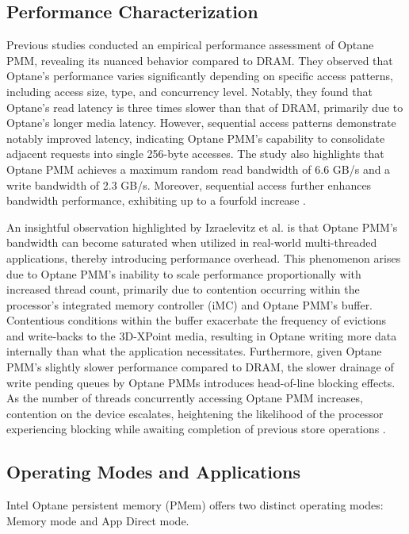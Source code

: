 \subsection{Performance Characterization}
Previous studies \cite{yang2020empirical,izraelevitz2019basic} conducted an empirical performance assessment of Optane PMM, revealing its nuanced behavior compared to DRAM. They observed that Optane's performance varies significantly depending on specific access patterns, including access size, type, and concurrency level. Notably, they found that Optane's read latency is three times slower than that of DRAM, primarily due to Optane's longer media latency. However, sequential access patterns demonstrate notably improved latency, indicating Optane PMM's capability to consolidate adjacent requests into single 256-byte accesses. The study also highlights that Optane PMM achieves a maximum random read bandwidth of 6.6 GB/s and a write bandwidth of 2.3 GB/s. Moreover, sequential access further enhances bandwidth performance, exhibiting up to a fourfold increase \cite{yang2020empirical,izraelevitz2019basic}.

An insightful observation highlighted by Izraelevitz et al. \cite{izraelevitz2019basic} is that Optane PMM's bandwidth can become saturated when utilized in real-world multi-threaded applications, thereby introducing performance overhead. This phenomenon arises due to Optane PMM's inability to scale performance proportionally with increased thread count, primarily due to contention occurring within the processor's integrated memory controller (iMC) and Optane PMM's buffer. Contentious conditions within the buffer exacerbate the frequency of evictions and write-backs to the 3D-XPoint media, resulting in Optane writing more data internally than what the application necessitates. Furthermore, given Optane PMM's slightly slower performance compared to DRAM, the slower drainage of write pending queues by Optane PMMs introduces head-of-line blocking effects. As the number of threads concurrently accessing Optane PMM increases, contention on the device escalates, heightening the likelihood of the processor experiencing blocking while awaiting completion of previous store operations \cite{yang2020empirical}.

\subsection{Operating Modes and Applications}

Intel Optane persistent memory (PMem) offers two distinct operating modes: Memory mode and App Direct mode.

